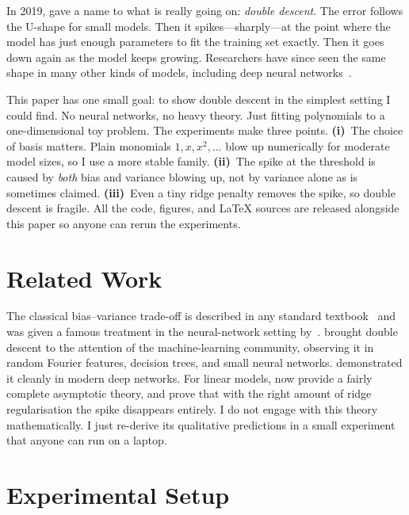 \documentclass[11pt]{article}
\begin{document}
In 2019, \citet{belkin2019reconciling} gave a name to what is really
going on: \emph{double descent}. The error follows the U-shape for
small models. Then it spikes---sharply---at the point where the
model has just enough parameters to fit the training set exactly.
Then it goes down again as the model keeps growing. Researchers
have since seen the same shape in many other kinds of models,
including deep neural networks~\citep{nakkiran2021deep}.

This paper has one small goal: to show double descent in the
simplest setting I could find. No neural networks, no heavy theory.
Just fitting polynomials to a one-dimensional toy problem. The
experiments make three points.
\textbf{(i)}~The choice of basis matters. Plain monomials
$1, x, x^2, \ldots$ blow up numerically for moderate model sizes, so
I use a more stable family.
\textbf{(ii)}~The spike at the threshold is caused by \emph{both}
bias and variance blowing up, not by variance alone as is sometimes
claimed.
\textbf{(iii)}~Even a tiny ridge penalty removes the spike, so
double descent is fragile. All the code, figures, and \LaTeX{}
sources are released alongside this paper so anyone can rerun the
experiments.

\section{Related Work}
\label{sec:related}

The classical bias--variance trade-off is described in any standard
textbook~\citep{hastie2009elements} and was given a famous treatment
in the neural-network setting by~\citet{geman1992neural}.
\citet{belkin2019reconciling} brought double descent to the
attention of the machine-learning community, observing it in random
Fourier features, decision trees, and small neural networks.
\citet{nakkiran2021deep} demonstrated it cleanly in modern deep
networks. For linear models, \citet{hastie2022surprises} now
provide a fairly complete asymptotic theory, and
\citet{nakkiran2020optimal} prove that with the right amount of
ridge regularisation the spike disappears entirely. I do not engage
with this theory mathematically. I just re-derive its qualitative
predictions in a small experiment that anyone can run on a laptop.

\section{Experimental Setup}
\label{sec:setup}
\end{document}
